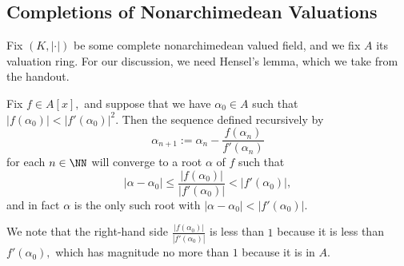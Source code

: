 \subsection{Completions of Nonarchimedean Valuations}
Fix $(K,|\cdot|)$ be some complete nonarchimedean valued field, and we fix $A$ its valuation ring. For our discussion, we need Hensel's lemma, which we take from the handout.
\begin{lemma}[Hensel]
	Fix $f\in A[x],$ and suppose that we have $\alpha_0\in A$ such that $|f(\alpha_0)|<|f'(\alpha_0)|^2.$ Then the sequence defined recursively by
	\[\alpha_{n+1}:=\alpha_n-\frac{f(\alpha_n)}{f'(\alpha_n)}\]
	for each $n\in\NN$ will converge to a root $\alpha$ of $f$ such that
	\[|\alpha-\alpha_0|\le\frac{|f(\alpha_0)|}{|f'(\alpha_0)|}<|f'(\alpha_0)|,\]
	and in fact $\alpha$ is the only such root with $|\alpha-\alpha_0|<|f'(\alpha_0)|.$
\end{lemma}
\begin{remark}
	We note that the right-hand side $\frac{|f(\alpha_0)|}{|f'(\alpha_0)|}$ is less than $1$ because it is less than $f'(\alpha_0),$ which has magnitude no more than $1$ because it is in $A.$
\end{remark}
